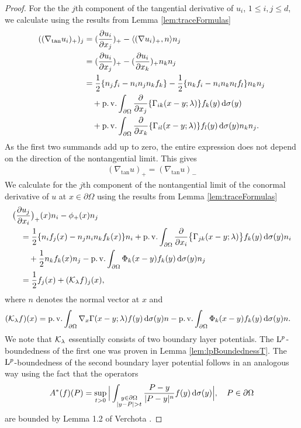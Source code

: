 \begin{proof}
  For the the $j$th component of the tangential derivative of $u_i$, $1\leq i,j \leq d$, we calculate using the results from Lemma \ref{lem:traceFormulas}
  \begin{align*}
    ((\nabla_{\mathrm{tan}} u_i)_+)_j
    &= (\frac{\partial u_i}{\partial x_j})_+ - \langle (\nabla u_i)_+, n \rangle n_j \\
    &= (\frac{\partial u_i}{\partial x_j} )_+ - (\frac{\partial u_i}{\partial x_k} )_+ n_k n_j \\
    &= \frac{1}{2} \{ n_j f_i - n_i n_j n_k f_k\} - \frac{1}{2} \{ n_k f_i - n_i n_k n_l f_l \} n_k n_j  \\
    &\quad+ \operatorname{p. v.} \int_{\partial\Omega} \frac{\partial}{\partial x_j} \{ \Gamma_{ik} (x - y; \lambda) \} f_k(y) \, {\operatorname{d}\!{\sigma}}(y) \\
    &\quad+ \operatorname{p. v.} \int_{\partial\Omega} \frac{\partial}{\partial x_k} \{ \Gamma_{il} (x - y; \lambda) \} f_l(y) \, {\operatorname{d}\!{\sigma}}(y) n_k n_j.
  \end{align*}
  As the first two summands add up to zero, the entire expression does not depend on the direction of the nontangential limit. 
  This gives
  \begin{align*}
    (\nabla_{\mathrm{tan}} u)_+ = (\nabla_{\mathrm{tan}} u)_-
  \end{align*}
  We calculate for the $j$th component of the nontangential limit of the conormal derivative of $u$ at $x \in \partial\Omega$ using the results from Lemma \ref{lem:traceFormulas}
  \begin{align*}
    &\big(\frac{\partial u_j}{\partial x_i}\big)_+(x) n_i - \phi_+(x) n_j\\
    &\quad= \frac{1}{2} \{ n_i f_j(x) - n_j n_i n_k f_k(x) \} n_i + \operatorname{p. v.} \int_{\partial\Omega} \frac{\partial}{\partial{x_i}} \big\{ \Gamma_{jk}(x - y; \lambda) \big\} f_k(y) \, {\operatorname{d}\!{\sigma}}(y) n_i \\
    &\qquad+ \frac{1}{2} n_k f_k(x) n_j - \operatorname{p. v.} \int_{\partial\Omega} \Phi_k(x - y) f_k(y) \, {\operatorname{d}\!{\sigma}}(y) n_j \\
    &\quad= \frac{1}{2} f_j(x) + (\mathcal{K}_\lambda f)_j(x),
  \end{align*}
  where $n$ denotes the normal vector at $x$ and
  \begin{align}
    \label{eq:defnKlambda}
    (\mathcal{K}_\lambda f) (x)
    &= \operatorname{p. v.} \int_{\partial\Omega} \nabla_x \Gamma(x - y; \lambda)  f(y) \, {\operatorname{d}\!{\sigma}}(y) n - \operatorname{p. v.} \int_{\partial\Omega} \Phi_k(x - y) f_k(y) \, {\operatorname{d}\!{\sigma}}(y) n.
  \end{align}
  We note that $\mathcal{K}_\lambda$ essentially consists of two boundary layer potentials. 
  The $\mathrm{L}^p$-boundedness of the first one was proven in Lemma \ref{lem:lpBoundednessT}.
  The $\mathrm{L}^p$-boundedness of the second boundary layer potential follows in an analogous way using the fact that the operators
  \begin{align*}
    A^*(f)(P) = \sup_{t > 0} \Big| \int_{\substack{y \in \partial\Omega \\ |y - P| > t}} \frac{P - y}{|P - y|^n} f(y) \, {\operatorname{d}\!{\sigma}}(y)\Big| , \quad P \in \partial\Omega
  \end{align*}
  are bounded by Lemma 1.2 of Verchota \cite{verchotaDiss}.
\end{proof}

